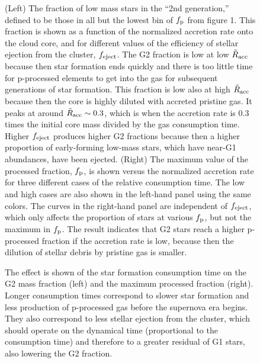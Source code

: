 \documentclass[12pt,preprint]{aastex}
\begin{document}
\clearpage
\begin{figure}
\caption{(Left) The fraction of low mass stars in the ``2nd generation,''
defined to be those in all but the lowest bin of $f_{\rm p}$ from figure 1.
This fraction is shown as a function of the normalized accretion rate onto the
cloud core, and for different values of the efficiency of stellar ejection from
the cluster, $f_{\rm eject}$. The G2 fraction is low at low ${\tilde R}_{\rm acc}$
because then star formation ends quickly and there is too little time for p-processed
elements to get into the gas for subsequent generations of star formation. This fraction
is low also at high ${\tilde R}_{\rm acc}$ because then the core is highly
diluted with accreted pristine gas. It peaks at around ${\tilde R}_{\rm acc}\sim0.3$,
which is when the accretion rate is 0.3 times the initial core mass divided by the
gas consumption time.  Higher $f_{\rm eject}$ produces higher G2 fractions because then
a higher proportion of early-forming low-mass stars, which have near-G1 abundances, have been
ejected. (Right) The maximum value of the processed fraction, $f_{\rm p}$, is shown
versus the normalized accretion rate for three different cases of the relative consumption time.
The low and high cases are also shown in the left-hand panel using the same colors.
The curves in the right-hand panel are independent of $f_{\rm eject}$, which only
affects the proportion of stars at various $f_{\rm p}$, but not the maximum in $f_{\rm p}$.
The result indicates that G2 stars reach a higher p-processed fraction if the
accretion rate is low, because then the dilution of stellar debris by pristine gas is
smaller.
} \label{walch16g2g1}\end{figure}

\clearpage
\begin{figure}
\caption{The effect is shown of the star formation consumption time on the
G2 mass fraction (left) and the maximum processed fraction (right).
Longer consumption times correspond to slower star formation and less
production of p-processed gas before the supernova era begins. They also
correspond to less stellar ejection from the cluster, which should
operate on the dynamical time (proportional to the consumption time)
and therefore to a greater residual of G1 stars, also lowering the
G2 fraction.} \label{walch16consume}\end{figure}
\end{document}
